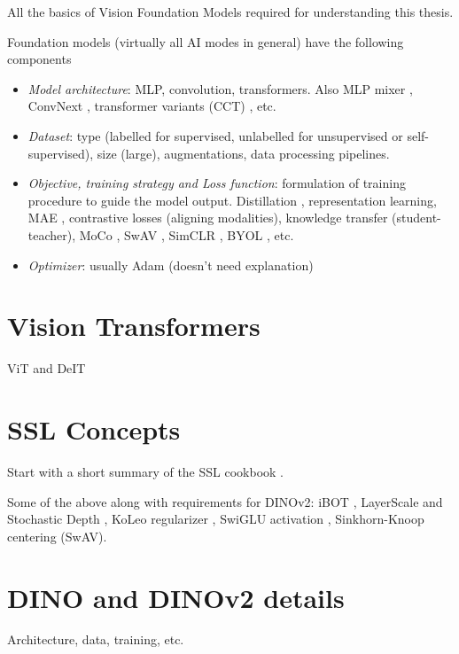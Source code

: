 
All the basics of Vision Foundation Models required for understanding 
this thesis.

Foundation models (virtually all AI modes in general) have the 
following components
\begin{itemize}
    \item \emph{Model architecture}: MLP, convolution, transformers. 
        Also MLP mixer \cite{Tolstikhin2021MLPMixerAA}, ConvNext 
        \cite{Liu2022ACF}, transformer variants (CCT) 
        \cite{Hassani2021EscapingTB}, etc. 
    \item \emph{Dataset}: type (labelled for supervised, unlabelled 
        for unsupervised or self-supervised), size (large), 
        augmentations, data processing pipelines. 
    \item \emph{Objective, training strategy and Loss function}: 
        formulation of training procedure to guide the model output. 
        Distillation \cite{Hinton2015DistillingTK}, representation 
        learning, MAE \cite{He2021MaskedAA}, contrastive losses 
        (aligning modalities), knowledge transfer (student-teacher), 
        MoCo \cite{He2019MomentumCF, Chen2020ImprovedBW}, SwAV 
        \cite{Caron2020UnsupervisedLO}, SimCLR
        \cite{Chen2020ASF, Chen2020BigSM}, 
        BYOL \cite{Grill2020BootstrapYO}, etc.
    \item \emph{Optimizer}: usually Adam \cite{Kingma2014AdamAM} 
        (doesn't need explanation)
\end{itemize}

\section{Vision Transformers}

ViT \cite{Dosovitskiy2020AnII} and DeIT \cite{Touvron2020TrainingDI}

\section{SSL Concepts}

Start with a short summary of the SSL cookbook \cite{Balestriero2023ACO}.

Some of the above along with requirements for DINOv2: 
iBOT \cite{Zhou2021iBOTIB}, LayerScale and Stochastic Depth 
\cite{Huang2016DeepNW}, KoLeo regularizer 
\cite{Sablayrolles2018SpreadingVF}, SwiGLU activation 
\cite{Shazeer2020GLUVI}, Sinkhorn-Knoop centering 
\cite{Caron2020UnsupervisedLO} (SwAV).

\section{DINO and DINOv2 details}

Architecture, data, training, etc.
